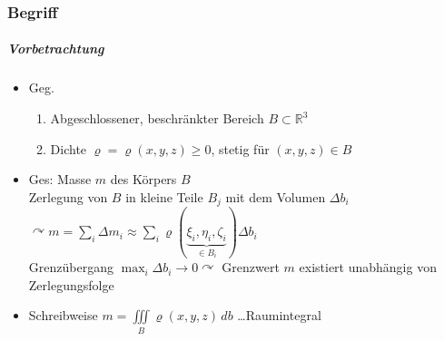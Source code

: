 \documentclass[a4paper]{scrartcl}
\begin{document}
\subsubsection{Begriff}
\subparagraph{Vorbetrachtung}
\begin{itemize}
\item Geg.
\begin{enumerate}
\item Abgeschlossener, beschränkter Bereich $B \subset \mathbb{R}^3$
\item Dichte $\varrho = \varrho (x,y,z) \geq 0$, stetig für $(x,y,z) \in B$
\end{enumerate}
\item Ges: Masse $m$ des Körpers $B$\\
Zerlegung von $B$ in kleine Teile $B_j$ mit dem Volumen $\Delta b_i$\\
$\curvearrowright m = \sum\limits_{i} \Delta m_i \approx \sum\limits_i \varrho (\underbrace{\xi_i, \eta_i, \zeta_i}_{\in B_i}) \Delta b_i$\\
Grenzübergang $\max_i{\Delta b_i} \to 0 \curvearrowright$ Grenzwert $m$ existiert unabhängig von Zerlegungsfolge
\item Schreibweise $m= \iiint\limits_B \varrho (x,y,z) \, db$ \dots Raumintegral 
\end{itemize}
\end{document}
